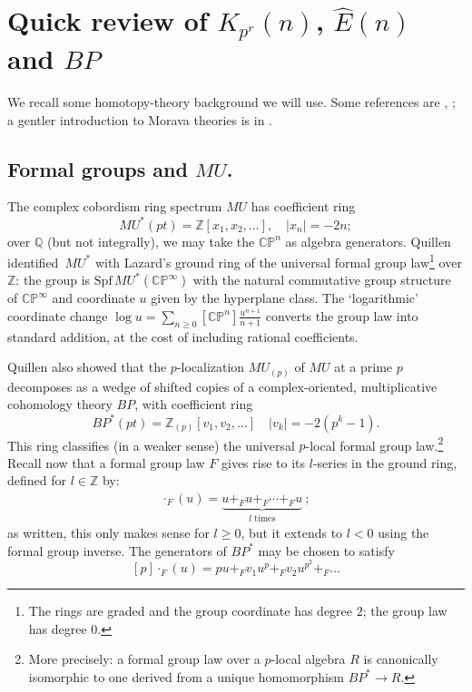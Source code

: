 \documentclass[11pt, reqno]{amsart}
\theoremstyle{plain}
\theoremstyle{definition}
\newcommand{\En}{\widehat{E}(n)}
\DeclareMathOperator*{\gplus}{+}
\DeclareMathOperator*{\gdot}{\cdot}
\begin{document}
\section{Quick review of $K_{p^r}(n)$, $\En$ and $BP$}

We recall some homotopy-theory background we will use. Some references are \cite{Ravenel}, 
\cite[\S1]{HoveyStrickland};   a gentler introduction to Morava theories is in \cite{Wurgler}.  

\subsection{Formal groups and $MU$.}
The complex cobordism ring spectrum $MU$ has coefficient ring 
\[
MU^*(pt) = \mathbb{Z}[x_1,x_2,\dots], \quad |x_n| = -2n;
\] 
over $\mathbb{Q}$ (but not integrally), we may take the $\mathbb{CP}^n$ as algebra generators. Quillen  
identified~$MU^*$ with Lazard's ground ring of the universal formal group law\footnote{The rings are graded 
and the group coordinate has degree $2$; the group law has degree $0$.} over $\mathbb{Z}$: 
the  group is $\mathrm{Spf}\, MU^*\left(\mathbb{CP}^\infty\right)$ with the natural 
commutative group structure of $\mathbb{CP}^\infty$ and coordinate $u$ given by the hyperplane class. 
The `logarithmic' coordinate change $\log u = \sum_{n\ge 0} [\mathbb{CP}^n]\frac{u^{n+1}}{n+1}$ 
converts the group law into  standard addition, at the cost of including rational coefficients.  

Quillen also showed that the $p$-localization $MU_{(p)}$ of $MU$ at a prime $p$ decomposes as a wedge 
of shifted copies of a complex-oriented, multiplicative cohomology theory $BP$, with coefficient ring
\[
BP^*(pt) = \mathbb{Z}_{(p)}[v_1,v_2,\dots] \quad |v_k| = -2(p^k - 1).
\]
This ring classifies (in a weaker sense) the universal $p$-local formal group law.\footnote
{More precisely: a formal group law over a $p$-local algebra $R$ is canonically isomorphic 
to one derived from a unique homomorphism $BP^*\to R$.} Recall now that a formal group law 
$F$ gives rise to its $l$-series in the ground ring, defined for $l \in \mathbb{Z}$ by: 
\begin{align}
[l]\gdot_{F}(u) =\underbrace{u\gplus_{F} u\gplus_{F} \cdots \gplus_{F} u}_{l \text{ times}}\:;  
\end{align}
\noindent
as written, this only makes sense for $l \geq 0$, but it extends to $l<0$ using the formal group 
inverse.  The generators of $BP^*$ may be chosen to satisfy
\[
[p]\gdot_F (u) = pu \gplus_{F} v_1 u^{p} \gplus_F v_2 u^{p^2} 
	\gplus_F \dots 
\]
\end{document}
